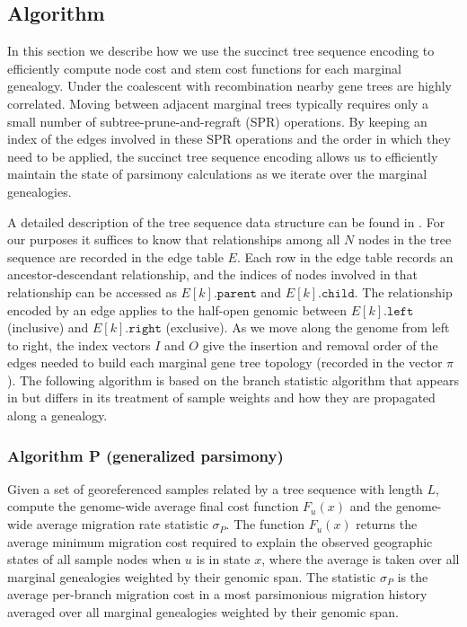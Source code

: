 
\subsection{Algorithm}

In this section we describe how we use the succinct tree sequence encoding
\citep{Kelleher_etal_2016} to efficiently compute node cost and stem cost 
functions for each marginal genealogy. Under the coalescent with recombination 
nearby gene trees are highly correlated. Moving between adjacent marginal trees 
typically requires only a small number of subtree-prune-and-regraft (SPR) 
operations. By keeping an index of the edges involved in these SPR operations 
and the order in which they need to be applied, the succinct tree sequence 
encoding allows us to efficiently maintain the state of parsimony calculations 
as we iterate over the marginal genealogies.

A detailed description of the tree sequence data structure can be found in
\citet{Kelleher_etal_2016}. For our purposes it suffices to know that
relationships among all $N$ nodes in the tree sequence are recorded in the edge 
table $E$. Each row in the edge table records an ancestor-descendant
relationship, and the indices of nodes involved in that relationship can be 
accessed as $E[k].\texttt{parent}$ and  $E[k].\texttt{child}$. The relationship 
encoded by an edge applies to the half-open genomic between $E[k].\texttt{left}$ 
(inclusive) and $E[k].\texttt{right}$ (exclusive). As we move along the genome 
from left to right, the index vectors $I$ and $O$ give the insertion and
removal order of the edges needed to build each marginal gene tree topology 
(recorded in the vector $\pi$). The following algorithm is based on
the branch statistic algorithm that appears in \citep{Ralph_etal_2020} but
differs in its treatment of sample weights and how they are propagated along
a genealogy.

\subsubsection*{Algorithm P (generalized parsimony)}

Given a set of georeferenced samples related by a tree sequence with length
$L$, compute the genome-wide average final cost function $F_u(x)$ and the
genome-wide average migration rate statistic $\sigma_P$. The function $F_u(x)$ 
returns the average minimum migration cost required to explain the observed 
geographic states of all sample nodes when $u$ is in state $x$, where the 
average is taken over all marginal genealogies weighted by their genomic span. 
The statistic $\sigma_P$ is the average per-branch migration cost in a most
parsimonious migration history averaged over all marginal genealogies weighted 
by their genomic span.

